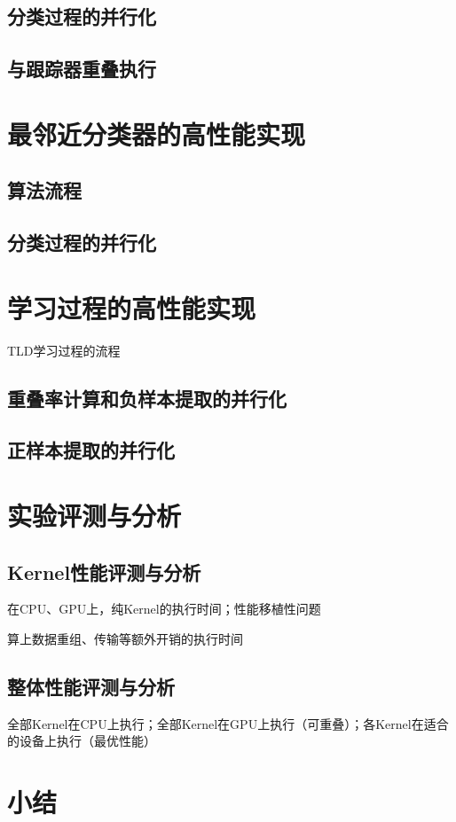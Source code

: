 \subsection{分类过程的并行化}
\subsection{与跟踪器重叠执行}

\section{最邻近分类器的高性能实现}
\subsection{算法流程}
\subsection{分类过程的并行化}

\section{学习过程的高性能实现}
TLD学习过程的流程
\subsection{重叠率计算和负样本提取的并行化}
\subsection{正样本提取的并行化}

\section{实验评测与分析}
\subsection{Kernel性能评测与分析}
在CPU、GPU上，纯Kernel的执行时间；性能移植性问题

算上数据重组、传输等额外开销的执行时间

\subsection{整体性能评测与分析}
全部Kernel在CPU上执行；全部Kernel在GPU上执行（可重叠）；各Kernel在适合的设备上执行（最优性能）

\section{小结}